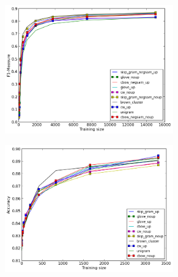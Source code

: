 \documentclass[11pt]{article}
\begin{document}
\begin{figure}
\caption{Best results for each method for NER and MWE}
\centering
\begin{subfigure}{.5\textwidth}
	\centering
    	\includegraphics[width=0.8\textwidth]{plots/bestNER.png}
	\label{fig:bestner}
\end{subfigure}
\begin{subfigure}{.5\textwidth}
	\centering
    	\includegraphics[width=0.8\textwidth]{plots/bestMWE.png}
	\label{fig:bestmwe}
\end{subfigure}  	
\end{figure}  	


\end{document}
